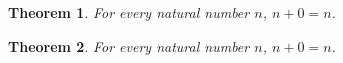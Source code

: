 \documentclass{article}
\newtheorem{theorem}{Theorem}
\begin{document}
\begin{theorem}\label{thm:retry-b}
For every natural number $n$, $n+0=n$.
\end{theorem}

\begin{theorem}\label{thm:retry-consumer}
For every natural number $n$, $n+0=n$.
\end{theorem}
\end{document}
